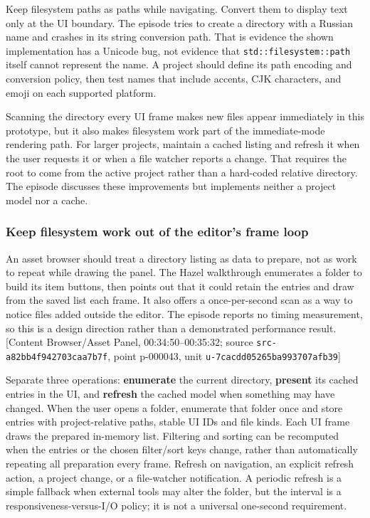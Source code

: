 Keep filesystem paths as paths while navigating. Convert them to display text only at the UI boundary. The episode tries to create a directory with a Russian name and crashes in its string conversion path. That is evidence the shown implementation has a Unicode bug, not evidence that \texttt{std::filesystem::path} itself cannot represent the name. A project should define its path encoding and conversion policy, then test names that include accents, CJK characters, and emoji on each supported platform.

Scanning the directory every UI frame makes new files appear immediately in this prototype, but it also makes filesystem work part of the immediate-mode rendering path. For larger projects, maintain a cached listing and refresh it when the user requests it or when a file watcher reports a change. That requires the root to come from the active project rather than a hard-coded relative directory. The episode discusses these improvements but implements neither a project model nor a cache.

\subsubsection{Keep filesystem work out of the editor's frame loop}\label{06-engine-ii-ch027-keep-filesystem-work-out-of-the-editors-frame-loop}

An asset browser should treat a directory listing as data to prepare, not as work to repeat while drawing the panel. The Hazel walkthrough enumerates a folder to build its item buttons, then points out that it could retain the entries and draw from the saved list each frame. It also offers a once-per-second scan as a way to notice files added outside the editor. The episode reports no timing measurement, so this is a design direction rather than a demonstrated performance result. {[}Content Browser/Asset Panel, 00:34:50--00:35:32; source \texttt{src-a82bb4f942703caa7b7f}, point p-000043, unit \texttt{u-7cacdd05265ba993707afb39}{]}

Separate three operations: \textbf{enumerate} the current directory, \textbf{present} its cached entries in the UI, and \textbf{refresh} the cached model when something may have changed. When the user opens a folder, enumerate that folder once and store entries with project-relative paths, stable UI IDs and file kinds. Each UI frame draws the prepared in-memory list. Filtering and sorting can be recomputed when the entries or the chosen filter/sort keys change, rather than automatically repeating all preparation every frame. Refresh on navigation, an explicit refresh action, a project change, or a file-watcher notification. A periodic refresh is a simple fallback when external tools may alter the folder, but the interval is a responsiveness-versus-I/O policy; it is not a universal one-second requirement.

